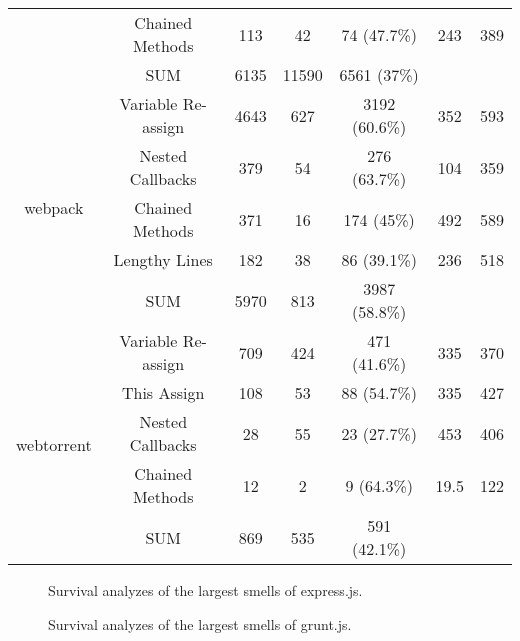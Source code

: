 {\begin{table*}[!htbp]
\begin{tabular}{c|c|c|c|c|c|c}
		& Chained Methods & 113 & 42 & 74 (47.7\%) & 243 & 389 \\ \cline{2-7}
		& SUM & 6135 & 11590 & 6561 (37\%) & & \\ \hline
		\multirow{5}{*}{webpack}
		& Variable Re-assign & 4643 & 627 & 3192 (60.6\%) & 352 & 593 \\ \cline{2-7}
		& Nested Callbacks & 379 & 54 & 276 (63.7\%) & 104 & 359 \\ \cline{2-7}
		& Chained Methods & 371 & 16 & 174 (45\%) & 492 & 589 \\ \cline{2-7}
		& Lengthy Lines & 182 & 38 & 86 (39.1\%) & 236 & 518 \\ \cline{2-7}
		& SUM & 5970 & 813 & 3987 (58.8\%) & & \\ \hline
		\multirow{5}{*}{webtorrent}
		& Variable Re-assign & 709 & 424 & 471 (41.6\%) & 335 & 370 \\ \cline{2-7}
		& This Assign & 108 & 53 & 88 (54.7\%) & 335 & 427 \\ \cline{2-7}
		& Nested Callbacks & 28 & 55 & 23 (27.7\%) & 453 & 406 \\ \cline{2-7}
		& Chained Methods & 12 & 2 & 9 (64.3\%) & 19.5 & 122 \\ \cline{2-7}
		& SUM & 869 & 535 & 591 (42.1\%) & & \\ \hline
	\end{tabular}
	\label{survivalsmells}
\end{table*}

\begin{figure*}[!htbp]
	\centering%
	\caption{Survival analyzes of the largest smells of express.js.\vspace{-10pt}}
	\label{survivalplots1}
\end{figure*}

\begin{figure*}[!htbp]
	\centering%
	\caption{Survival analyzes of the largest smells of grunt.js.\vspace{-10pt}}
	\label{survivalplots2}
\end{figure*}

}
